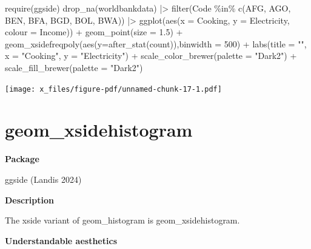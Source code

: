 \documentclass[
  letterpaper,
  DIV=11,
  numbers=noendperiod]{scrreprt}
\newenvironment{Shaded}{\begin{snugshade}}{\end{snugshade}}
\newcommand{\AttributeTok}[1]{\textcolor[rgb]{0.40,0.45,0.13}{#1}}
\newcommand{\DecValTok}[1]{\textcolor[rgb]{0.68,0.00,0.00}{#1}}
\newcommand{\FloatTok}[1]{\textcolor[rgb]{0.68,0.00,0.00}{#1}}
\newcommand{\FunctionTok}[1]{\textcolor[rgb]{0.28,0.35,0.67}{#1}}
\newcommand{\NormalTok}[1]{\textcolor[rgb]{0.00,0.23,0.31}{#1}}
\newcommand{\SpecialCharTok}[1]{\textcolor[rgb]{0.37,0.37,0.37}{#1}}
\newcommand{\StringTok}[1]{\textcolor[rgb]{0.13,0.47,0.30}{#1}}
\begin{document}
\begin{Shaded}
\begin{Highlighting}[]
\FunctionTok{require}\NormalTok{(ggside)}
\FunctionTok{drop\_na}\NormalTok{(worldbankdata) }\SpecialCharTok{|\textgreater{}}
  \FunctionTok{filter}\NormalTok{(Code }\SpecialCharTok{\%in\%} \FunctionTok{c}\NormalTok{(}\StringTok{\textquotesingle{}AFG\textquotesingle{}}\NormalTok{, }\StringTok{\textquotesingle{}AGO\textquotesingle{}}\NormalTok{, }\StringTok{\textquotesingle{}BEN\textquotesingle{}}\NormalTok{, }\StringTok{\textquotesingle{}BFA\textquotesingle{}}\NormalTok{, }\StringTok{\textquotesingle{}BGD\textquotesingle{}}\NormalTok{, }\StringTok{\textquotesingle{}BOL\textquotesingle{}}\NormalTok{, }\StringTok{\textquotesingle{}BWA\textquotesingle{}}\NormalTok{)) }\SpecialCharTok{|\textgreater{}}
  \FunctionTok{ggplot}\NormalTok{(}\FunctionTok{aes}\NormalTok{(}\AttributeTok{x =}\NormalTok{ Cooking, }\AttributeTok{y =}\NormalTok{ Electricity, }\AttributeTok{colour =}\NormalTok{ Income)) }\SpecialCharTok{+}
  \FunctionTok{geom\_point}\NormalTok{(}\AttributeTok{size =} \FloatTok{1.5}\NormalTok{) }\SpecialCharTok{+} 
  \FunctionTok{geom\_xsidefreqpoly}\NormalTok{(}\FunctionTok{aes}\NormalTok{(}\AttributeTok{y=}\FunctionTok{after\_stat}\NormalTok{(count)),}\AttributeTok{binwidth =} \DecValTok{500}\NormalTok{) }\SpecialCharTok{+}
  \FunctionTok{labs}\NormalTok{(}\AttributeTok{title =} \StringTok{""}\NormalTok{, }\AttributeTok{x =} \StringTok{"Cooking"}\NormalTok{, }\AttributeTok{y =} \StringTok{"Electricity"}\NormalTok{) }\SpecialCharTok{+} \FunctionTok{scale\_color\_brewer}\NormalTok{(}\AttributeTok{palette =} \StringTok{"Dark2"}\NormalTok{) }\SpecialCharTok{+} \FunctionTok{scale\_fill\_brewer}\NormalTok{(}\AttributeTok{palette =} \StringTok{"Dark2"}\NormalTok{)}
\end{Highlighting}
\end{Shaded}

\texttt{[image: x\_files/figure-pdf/unnamed-chunk-17-1.pdf]}

\section{geom\_xsidehistogram}\label{xsidehistogram}

\textbf{Package}

ggside (Landis 2024)

\textbf{Description}

The xside variant of geom\_histogram is geom\_xsidehistogram.

\textbf{Understandable aesthetics}
\end{document}
